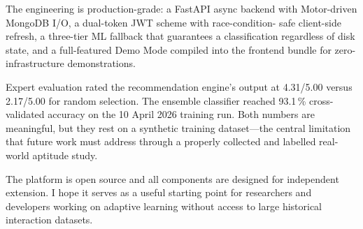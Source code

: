 \documentclass[12pt,a4paper]{article}
\begin{document}
The engineering is production-grade: a FastAPI async backend with
Motor-driven MongoDB I/O, a dual-token JWT scheme with race-condition-
safe client-side refresh, a three-tier ML fallback that guarantees
a classification regardless of disk state, and a full-featured
Demo Mode compiled into the frontend bundle for zero-infrastructure
demonstrations.

Expert evaluation rated the recommendation engine's output at
4.31/5.00 versus 2.17/5.00 for random selection. The ensemble
classifier reached 93.1\,\% cross-validated accuracy on the
10 April 2026 training run. Both numbers are meaningful, but
they rest on a synthetic training dataset---the central limitation
that future work must address through a properly collected and
labelled real-world aptitude study.

The platform is open source and all components are designed for
independent extension. I hope it serves as a useful starting point
for researchers and developers working on adaptive learning without
access to large historical interaction datasets.
\end{document}
